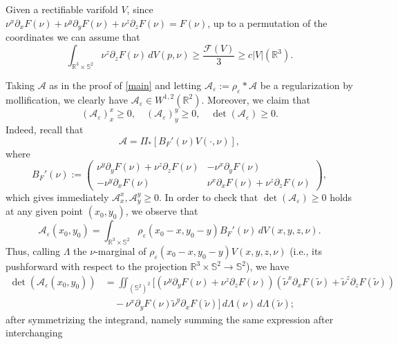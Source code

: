 \documentclass[11pt,a4paper]{amsart}
\newcommand{\R}{\mathbb{R}}
\newcommand{\de}{\partial}
\theoremstyle{definition}
\renewcommand{\epsilon}{\varepsilon}
\begin{document}
Given a rectifiable varifold $V$, since $\nu^x\de_xF(\nu)+\nu^y\de_yF(\nu)+\nu^z\de_zF(\nu)=F(\nu)$,
up to a permutation of the coordinates we can assume that
$$\int_{\R^3\times\mathbb{S}^2}\nu^z\de_zF(\nu)\,dV(p,\nu)\ge\frac{\mathcal{F}(V)}{3}\ge c|V|(\R^3).$$

Taking $\mathcal{A}$ as in the proof of \cref{main} and letting
$\mathcal{A}_\epsilon:=\rho_\epsilon*\mathcal{A}$ be a regularization
by mollification, we clearly have $\mathcal{A}_\epsilon\in W^{1,2}(\R^2)$. Moreover, we claim that
$$(\mathcal{A}_\epsilon)_x^x\ge0,\quad(\mathcal{A}_\epsilon)_y^y\ge0,\quad\det(\mathcal{A}_\epsilon)\ge0.$$
Indeed, recall that
$$\mathcal{A}=\Pi_*[B_F'(\nu)V(\cdot,\nu)],$$
where
$$B_F'(\nu):=\begin{pmatrix}\nu^y\de_yF(\nu)+\nu^z\de_zF(\nu) & -\nu^x\de_yF(\nu)\\
	-\nu^y\de_xF(\nu) & \nu^x\de_xF(\nu)+\nu^z\de_zF(\nu)\end{pmatrix},$$
which gives immediately $\mathcal{A}_x^x,\mathcal{A}_y^y\ge0$.
In order to check that $\det(\mathcal{A}_\epsilon)\ge0$
holds at any given point $(x_0,y_0)$, we observe that
$$\mathcal{A}_\epsilon(x_0,y_0)
=\int_{\R^3\times\mathbb{S}^2}\rho_\epsilon(x_0-x,y_0-y)B_F'(\nu)\,dV(x,y,z,\nu).$$
Thus, calling $\Lambda$ the $\nu$-marginal of $\rho_\epsilon(x_0-x,y_0-y)V(x,y,z,\nu)$ (i.e., its pushforward
with respect to the projection $\R^3\times\mathbb{S}^2\to\mathbb{S}^2$), we have
\begin{align*}
    \det(\mathcal{A}_\epsilon(x_0,y_0))&=\iint_{(\mathbb{S}^2)^2}
    [(\nu^y\de_yF(\nu)+\nu^z\de_zF(\nu))(\tilde\nu^x\de_xF(\tilde\nu)+\tilde\nu^z\de_zF(\tilde\nu))\\
    &\quad-\nu^x\de_yF(\nu)\tilde\nu^y\de_xF(\tilde\nu)]\,d\Lambda(\nu)\,d\Lambda(\tilde\nu);
\end{align*}
after symmetrizing the integrand, namely summing the same expression after interchanging
\end{document}
